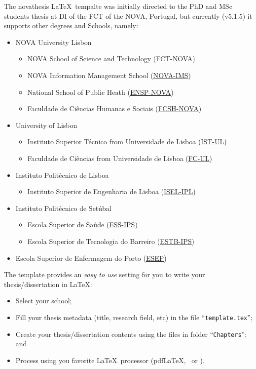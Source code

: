 The \gls{novathesis} \LaTeX\ tempalte was initially directed to the PhD and MSc students thesis at \gls{DI} of the \gls{FCT} of the \gls{NOVA}, Portugal, but currently (v5.1.5) it supports other degrees and Schools, namely:
\begin{itemize}
  \item NOVA University Lisbon
  \begin{itemize}
    \item NOVA School of Science and Technology \href{https://www.fct.unl.pt}{(FCT-NOVA)}
    \item NOVA Information Management School (\href{https://www.novaims.unl.pt}{NOVA-IMS})
    \item National School of Public Heath (\href{https://www.ensp.unl.pt}{ENSP-NOVA})
    \item Faculdade de Ciências Humanas e Sociais (\href{https://www.fcsh.unl.pt}{FCSH-NOVA})
  \end{itemize}
  \item University of Lisbon
  \begin{itemize}
    \item Instituto Superior Técnico from Universidade de Lisboa (\href{https://tecnico.ulisboa.pt}{IST-UL})
    \item Faculdade de Ciências from  Universidade de Lisboa (\href{https://ciencias.ulisboa.pt}{FC-UL})
  \end{itemize}
  \item Instituto Politécnico de Lisboa
  \begin{itemize}
    \item Instituto Superior de Engenharia de Lisboa (\href{https://www.isel.pt}{ISEL-IPL})
  \end{itemize}
  \item Instituto Politécnico de Setúbal
   \begin{itemize}
    \item Escola Superior de Saúde (\href{https://www.ess.ips.pt}{ESS-IPS})
    \item Escola Superior de Tecnologia do Barreiro (\href{https://www.estbarreiro.ips.pt}{ESTB-IPS})
  \end{itemize}
  \item Escola Superior de Enfermagem do Porto (\href{https://www.esenf.pt/pt/}{ESEP})
\end{itemize}

The template provides an \emph{easy to use} setting for you to write your thesis/dissertation in \LaTeX:
\begin{itemize}
  \item  Select your school;
  \item Fill your thesis metadata (title, research field, etc) in the file “\texttt{template.tex}”;
  \item Create your thesis/dissertation contents using the files in folder “\texttt{Chapters}”; and
  \item Process using you favorite \LaTeX\ processor (pdf\LaTeX, \XeLaTeX\ or \LuaLaTeX).
\end{itemize}

